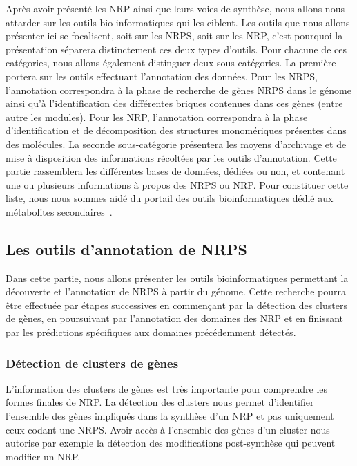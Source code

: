 Après avoir présenté les NRP ainsi que leurs voies de synthèse, nous allons nous attarder sur les outils bio-informatiques qui les ciblent.
Les outils que nous allons présenter ici se focalisent, soit sur les NRPS, soit sur les NRP, c'est pourquoi la présentation séparera distinctement ces deux types d'outils.
Pour chacune de ces catégories, nous allons également distinguer deux sous-catégories.
La première portera sur les outils effectuant l'annotation des données.
Pour les NRPS, l'annotation correspondra à la phase de recherche de gènes NRPS dans le génome ainsi qu'à l'identification des différentes briques contenues dans ces gènes (entre autre les modules).
Pour les NRP, l'annotation correspondra à la phase d'identification et de décomposition des structures monomériques présentes dans des molécules.
La seconde sous-catégorie présentera les moyens d'archivage et de mise à disposition des informations récoltées par les outils d'annotation.
Cette partie rassemblera les différentes bases de données, dédiées ou non, et contenant une ou plusieurs informations à propos des NRPS ou NRP.
Pour constituer cette liste, nous nous sommes aidé du portail des outils bioinformatiques dédié aux métabolites secondaires~\cite{weber_secondary_2016}.

\subsection{Les outils d'annotation de NRPS}

Dans cette partie, nous allons présenter les outils bioinformatiques permettant la découverte et l'annotation de NRPS à partir du génome.
Cette recherche pourra être effectuée par étapes successives en commençant par la détection des clusters de gènes, en poursuivant par l'annotation des domaines des NRP et en finissant par les prédictions spécifiques aux domaines précédemment détectés.

\subsubsection{Détection de clusters de gènes}

L'information des clusters de gènes est très importante pour comprendre les formes finales de NRP.
La détection des clusters nous permet d'identifier l'ensemble des gènes impliqués dans la synthèse d'un NRP et pas uniquement ceux codant une NRPS.
Avoir accès à l'ensemble des gènes d'un cluster nous autorise par exemple la détection des modifications post-synthèse qui peuvent modifier un NRP.

